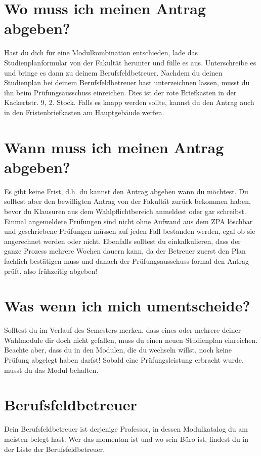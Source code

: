 \documentclass{lecture}
\begin{document}
	\section{Wo muss ich meinen Antrag abgeben?}

	Hast du dich für eine Modulkombination entschieden, lade das Studienplanformular von der Fakultät herunter und fülle es aus.
	Unterschreibe es und bringe es dann zu deinem Berufsfeldbetreuer.
	Nachdem du deinen Studienplan bei deinem Berufsfeldbetreuer hast unterzeichnen lassen, musst du ihn beim Prüfungsausschuss einreichen.
	Dies ist der rote Briefkasten in der Kackertstr. 9, 2. Stock.
	Falls es knapp werden sollte, kannst du den Antrag auch in den Fristenbriefkasten am Hauptgebäude werfen.


	\section{Wann muss ich meinen Antrag abgeben?}

	Es gibt keine Frist, d.h. du kannst den Antrag abgeben wann du möchtest.
	Du solltest aber den bewilligten Antrag von der Fakultät zurück bekommen haben, bevor du Klausuren aus dem Wahlpflichtbereich anmeldest oder gar schreibst.
	Einmal angemeldete Prüfungen sind nicht ohne Aufwand aus dem ZPA löschbar und geschriebene Prüfungen müssen auf jeden Fall bestanden werden, egal ob sie angerechnet werden oder nicht.
	Ebenfalls solltest du einkalkulieren, dass der ganze Prozess mehrere Wochen dauern kann, da der Betreuer zuerst den Plan fachlich bestätigen muss und danach der Prüfungsausschuss formal den Antrag prüft, also frühzeitig abgeben!


	\section{Was wenn ich mich umentscheide?}

	Solltest du im Verlauf des Semesters merken, dass eines oder mehrere deiner Wahlmodule dir doch nicht gefallen, muss du einen neuen Studienplan einreichen.
	Beachte aber, dass du in den Modulen, die du wechseln willst, noch keine Prüfung abgelegt haben darfst!
	Sobald eine Prüfungsleistung erbracht wurde, musst du das Modul behalten.


	\section{Berufsfeldbetreuer}

	Dein Berufsfeldbetreuer ist derjenige Professor, in dessen Modulkatalog du am meisten belegt hast.
	Wer das momentan ist und wo sein Büro ist, findest du in der Liste der Berufsfeldbetreuer.
\end{document}
